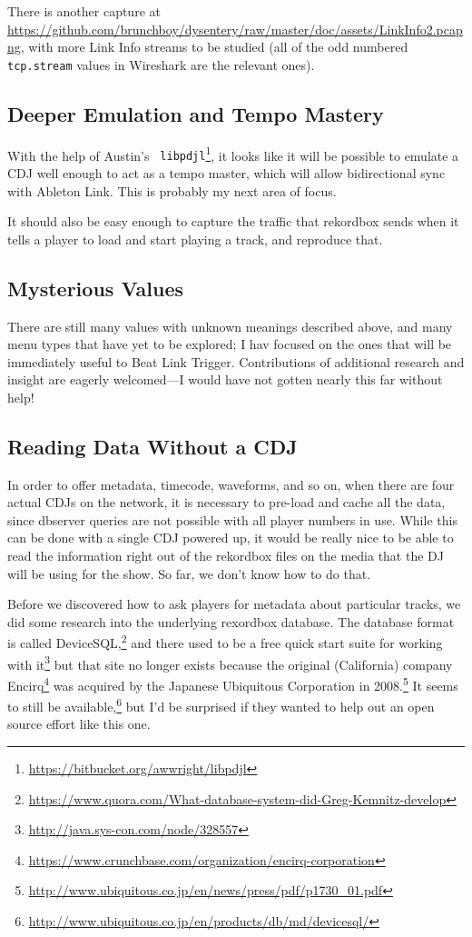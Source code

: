 \documentclass[11pt]{article}
\begin{document}
There is another capture at
\url{https://github.com/brunchboy/dysentery/raw/master/doc/assets/LinkInfo2.pcapng},
with more Link Info streams to be studied (all of the odd numbered
{\tt tcp.stream} values in Wireshark are the relevant ones).

\subsection{Deeper Emulation and Tempo Mastery}

With the help of Austin's {\tt
 libpdjl}\footnote{\url{https://bitbucket.org/awwright/libpdjl}}, it
looks like it will be possible to emulate a CDJ well enough to act as
a tempo master, which will allow bidirectional sync with Ableton Link.
This is probably my next area of focus.

It should also be easy enough to capture the traffic that rekordbox
sends when it tells a player to load and start playing a track, and
reproduce that.

\subsection{Mysterious Values}

There are still many values with unknown meanings described above, and
many menu types that have yet to be explored; I hav focused on the
ones that will be immediately useful to Beat Link Trigger.
Contributions of additional research and insight are eagerly
welcomed---I would have not gotten nearly this far without help!

\subsection{Reading Data Without a CDJ}

In order to offer metadata, timecode, waveforms, and so on, when there
are four actual CDJs on the network, it is necessary to pre-load and
cache all the data, since dbserver queries are not possible with all
player numbers in use. While this can be done with a single CDJ
powered up, it would be really nice to be able to read the information
right out of the rekordbox files on the media that the DJ will be
using for the show. So far, we don't know how to do that.

Before we discovered how to ask players for metadata about
particular tracks, we did some research into the underlying rexordbox
database. The database format is called
DeviceSQL,\footnote{\url{https://www.quora.com/What-database-system-did-Greg-Kemnitz-develop}}
and there used to be a free quick start suite for working with
it\footnote{\url{http://java.sys-con.com/node/328557}} but that site
no longer exists because the original (California) company
Encirq\footnote{\url{https://www.crunchbase.com/organization/encirq-corporation}}
was acquired by the Japanese Ubiquitous Corporation in
2008.\footnote{\url{http://www.ubiquitous.co.jp/en/news/press/pdf/p1730_01.pdf}}
It seems to still be
available,\footnote{\url{http://www.ubiquitous.co.jp/en/products/db/md/devicesql/}}
but I'd be surprised if they wanted to help out an open source effort
like this one.
\end{document}
